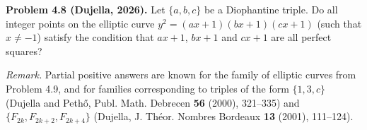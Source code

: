 \textbf{Problem 4.8 (Dujella, 2026).} Let $\{a,b,c\}$ be a Diophantine triple. Do all integer points on the elliptic curve $y^2=(ax+1)(bx+1)(cx+1)$ (such that $x \neq -1$) satisfy the condition that $ax+1$, $bx+1$ and $cx+1$ are all perfect squares?

\medskip

\textit{Remark.} Partial positive answers are known for the family of elliptic curves from Problem 4.9, and for families corresponding to triples of the form $\{1,3,c\}$ (Dujella and Pethő, Publ. Math. Debrecen \textbf{56} (2000), 321--335) and $\{F_{2k},F_{2k+2},F_{2k+4}\}$ (Dujella, J. Théor. Nombres Bordeaux \textbf{13} (2001), 111--124).
